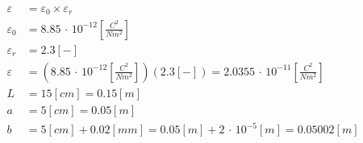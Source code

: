 \begin{align*}
\varepsilon &= \varepsilon_0 \times \varepsilon_r \\
\varepsilon_0 &= 8.85 \,\cdot\,10^{-12}\left[\frac{C^2}{Nm^2}\right] \\
\varepsilon_r &= 2.3[-] \\
\varepsilon &= \left( 8.85 \,\cdot\,10^{-12}\left[\frac{C^2}{Nm^2}\right] \right) \left( 2.3[-] \right) = 2.0355 \,\cdot\,10^{-11}\left[\frac{C^2}{Nm^2}\right] \\
L &= 15[cm] = 0.15[m] \\
a &= 5[cm] = 0.05[m] \\
b &= 5[cm] + 0.02[mm] = 0.05[m] + 2 \,\cdot\,10^{-5}[m] = 0.05002[m]
\end{align*}
